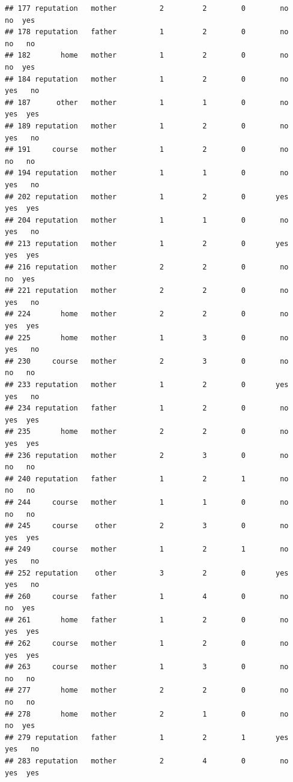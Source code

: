 \documentclass[
]{article}
\begin{document}
\begin{verbatim}
## 177 reputation   mother          2         2        0        no     no  yes
## 178 reputation   father          1         2        0        no     no   no
## 182       home   mother          1         2        0        no     no  yes
## 184 reputation   mother          1         2        0        no    yes   no
## 187      other   mother          1         1        0        no    yes  yes
## 189 reputation   mother          1         2        0        no    yes   no
## 191     course   mother          1         2        0        no     no   no
## 194 reputation   mother          1         1        0        no    yes   no
## 202 reputation   mother          1         2        0       yes    yes  yes
## 204 reputation   mother          1         1        0        no    yes   no
## 213 reputation   mother          1         2        0       yes    yes  yes
## 216 reputation   mother          2         2        0        no     no  yes
## 221 reputation   mother          2         2        0        no    yes   no
## 224       home   mother          2         2        0        no    yes  yes
## 225       home   mother          1         3        0        no    yes   no
## 230     course   mother          2         3        0        no     no   no
## 233 reputation   mother          1         2        0       yes    yes   no
## 234 reputation   father          1         2        0        no    yes  yes
## 235       home   mother          2         2        0        no    yes  yes
## 236 reputation   mother          2         3        0        no     no   no
## 240 reputation   father          1         2        1        no     no   no
## 244     course   mother          1         1        0        no     no   no
## 245     course    other          2         3        0        no    yes  yes
## 249     course   mother          1         2        1        no    yes   no
## 252 reputation    other          3         2        0       yes    yes   no
## 260     course   father          1         4        0        no     no  yes
## 261       home   father          1         2        0        no    yes  yes
## 262     course   mother          1         2        0        no    yes  yes
## 263     course   mother          1         3        0        no     no   no
## 277       home   mother          2         2        0        no     no   no
## 278       home   mother          2         1        0        no     no  yes
## 279 reputation   father          1         2        1       yes    yes   no
## 283 reputation   mother          2         4        0        no    yes  yes

\end{verbatim}
\end{document}
